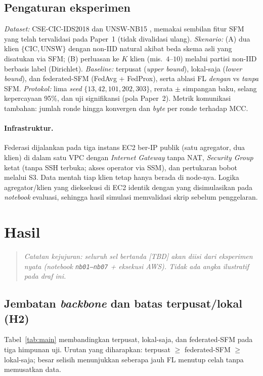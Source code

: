 \documentclass[11pt,a4paper]{article}
\newcommand{\TBD}{\textit{[TBD]}}
\begin{document}
\subsection{Pengaturan eksperimen}
\label{sec:setup}

\emph{Dataset:} CSE-CIC-IDS2018 \cite{cicids} dan UNSW-NB15 \cite{unsw}, memakai
sembilan fitur SFM yang telah tervalidasi pada Paper~1 (tidak divalidasi ulang).
\emph{Skenario:} (A) dua klien $\{\text{CIC},\text{UNSW}\}$ dengan non-IID natural
akibat beda skema asli yang disatukan via SFM; (B) perluasan ke $K$ klien
(mis.\ $4$--$10$) melalui partisi non-IID berbasis label (Dirichlet). \emph{Baseline:}
terpusat (\emph{upper bound}), lokal-saja (\emph{lower bound}), dan federated-SFM
(FedAvg + FedProx), serta ablasi FL \emph{dengan} vs \emph{tanpa} SFM. \emph{Protokol:}
lima \emph{seed} $\{13,42,101,202,303\}$, rerata $\pm$ simpangan baku, selang
kepercayaan 95\%, dan uji signifikansi (pola Paper~2). Metrik komunikasi tambahan:
jumlah ronde hingga konvergen dan \emph{byte} per ronde terhadap MCC.

\paragraph{Infrastruktur.} Federasi dijalankan pada tiga instans EC2 ber-IP publik
(satu agregator, dua klien) di dalam satu VPC dengan \emph{Internet Gateway} tanpa
NAT, \emph{Security Group} ketat (tanpa SSH terbuka; akses operator via SSM), dan
pertukaran bobot melalui S3. Data mentah tiap klien tetap hanya berada di
node-nya. Logika agregator/klien yang dieksekusi di EC2 identik dengan yang
disimulasikan pada \emph{notebook} evaluasi, sehingga hasil simulasi memvalidasi
skrip sebelum penggelaran.

\FloatBarrier
\section{Hasil}
\label{sec:results}

\begin{quote}
\small\itshape Catatan kejujuran: seluruh sel bertanda \TBD{} akan diisi dari
eksperimen nyata (notebook \texttt{nb01--nb07} + eksekusi AWS). Tidak ada angka
ilustratif pada draf ini.
\end{quote}

\subsection{Jembatan \emph{backbone} dan batas terpusat/lokal (H2)}
Tabel~\ref{tab:main} membandingkan terpusat, lokal-saja, dan federated-SFM pada
tiga himpunan uji. Urutan yang diharapkan: terpusat $\ge$ federated-SFM $\ge$
lokal-saja; besar selisih menunjukkan seberapa jauh FL menutup celah tanpa
memusatkan data.
\end{document}
